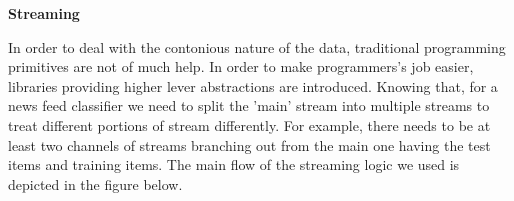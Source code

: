 \begin{center} \textbf{\huge Streaming} \end{center}
In order to deal with the contonious nature of the data, traditional programming primitives are not of much help. In order to make programmers's job easier, libraries providing higher lever abstractions are introduced. Knowing that, for a news feed classifier we need to split the 'main' stream into multiple streams to treat different portions of stream differently. For example, there needs to be at least two channels of streams branching out from the main one having the test items and training items. The main flow of the streaming logic we used is depicted in the figure below.
